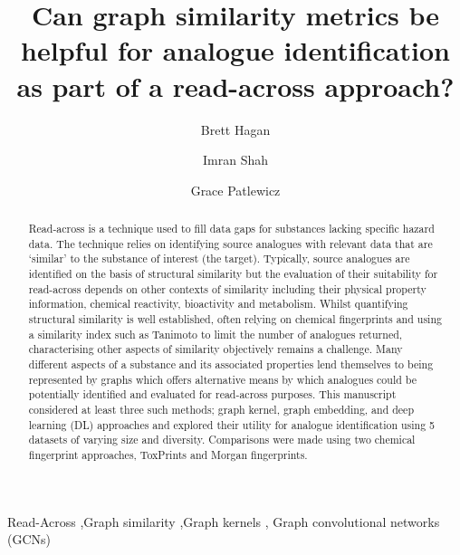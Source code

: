 \documentclass[
  super,
  preprint,
  3p]{elsarticle}
\begin{document}
\begin{frontmatter}
\title{Can graph similarity metrics be helpful for analogue
identification as part of a read-across approach?}
\author[1,2]{Brett Hagan%
%
}

\author[2]{Imran Shah%
%
}

\author[]{Grace Patlewicz%
%
}






        
\begin{abstract}
Read-across is a technique used to fill data gaps for substances lacking
specific hazard data. The technique relies on identifying source
analogues with relevant data that are `similar' to the substance of
interest (the target). Typically, source analogues are identified on the
basis of structural similarity but the evaluation of their suitability
for read-across depends on other contexts of similarity including their
physical property information, chemical reactivity, bioactivity and
metabolism. Whilst quantifying structural similarity is well
established, often relying on chemical fingerprints and using a
similarity index such as Tanimoto to limit the number of analogues
returned, characterising other aspects of similarity objectively remains
a challenge. Many different aspects of a substance and its associated
properties lend themselves to being represented by graphs which offers
alternative means by which analogues could be potentially identified and
evaluated for read-across purposes. This manuscript considered at least
three such methods; graph kernel, graph embedding, and deep learning
(DL) approaches and explored their utility for analogue identification
using 5 datasets of varying size and diversity. Comparisons were made
using two chemical fingerprint approaches, ToxPrints and Morgan
fingerprints.
\end{abstract}





\begin{keyword}
    Read-Across \sep Graph similarity \sep Graph kernels \sep 
    Graph convolutional networks (GCNs)
\end{keyword}
\end{frontmatter}
    
\end{document}
